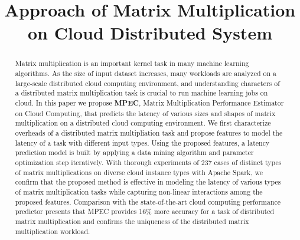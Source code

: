 \documentclass[10pt, conference, compsocconf]{IEEEtran}
\begin{document}

\title{Approach of Matrix Multiplication on Cloud Distributed System}


\author{
\and
{}
}

\maketitle

\begin{abstract}
  Matrix multiplication is an important kernel task in many machine learning algorithms. As the size of input dataset increases, many workloads are analyzed on a large-scale distributed cloud computing environment, and understanding characters of a distributed matrix multiplication task is crucial to run machine learning jobs on cloud. In this paper we propose \textbf{MPEC}, Matrix Multiplication Performance Estimator on Cloud Computing, that predicts the latency of various sizes and shapes of matrix multiplication on a distributed cloud computing environment. We first characterize overheads of a distributed matrix multipliation task and propose features to model the latency of a task with different input types. Using the proposed features, a latency prediction model is built by applying a data mining algorithm and parameter optimization step iteratively. With thorough experiments of 237 cases of distinct types of matrix multiplications on diverse cloud instance types with Apache Spark, we confirm that the proposed method is effective in modeling the latency of various types of matrix multiplication tasks while capturing non-linear interactions among the proposed features. Comparison with the state-of-the-art cloud computing performance predictor presents that MPEC provides 16\% more accuracy for a task of distributed matrix multiplication and confirms the uniqueness of the distributed matrix multiplication workload. 
\end{abstract}
\end{document}
